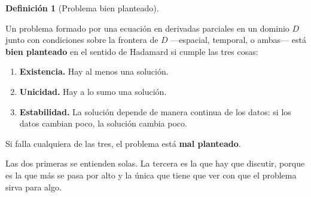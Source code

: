 \documentclass[
  spanish,
  a4paper,
]{scrbook}
\providecommand{\tightlist}{%
  \setlength{\itemsep}{0pt}\setlength{\parskip}{0pt}}
\theoremstyle{definition}
\newtheorem{definition}{Definición}[chapter]
\theoremstyle{plain}
\theoremstyle{definition}
\theoremstyle{plain}
\theoremstyle{definition}
\theoremstyle{remark}
\begin{document}
\begin{definition}[Problema bien
planteado]\protect\hypertarget{def-bien-planteado}{}\label{def-bien-planteado}

Un problema formado por una ecuación en derivadas parciales en un
dominio \(D\) junto con condiciones sobre la frontera de \(D\)
---espacial, temporal, o ambas--- está \textbf{bien planteado} en el
sentido de Hadamard si cumple las tres cosas:

\begin{enumerate}
\def\labelenumi{\arabic{enumi}.}
\tightlist
\item
  \textbf{Existencia.} Hay al menos una solución.
\item
  \textbf{Unicidad.} Hay a lo sumo una solución.
\item
  \textbf{Estabilidad.} La solución depende de manera continua de los
  datos: si los datos cambian poco, la solución cambia poco.
\end{enumerate}

Si falla cualquiera de las tres, el problema está \textbf{mal
planteado}.

\end{definition}

Las dos primeras se entienden solas. La tercera es la que hay que
discutir, porque es la que más se pasa por alto y la única que tiene que
ver con que el problema sirva para algo.
\end{document}
